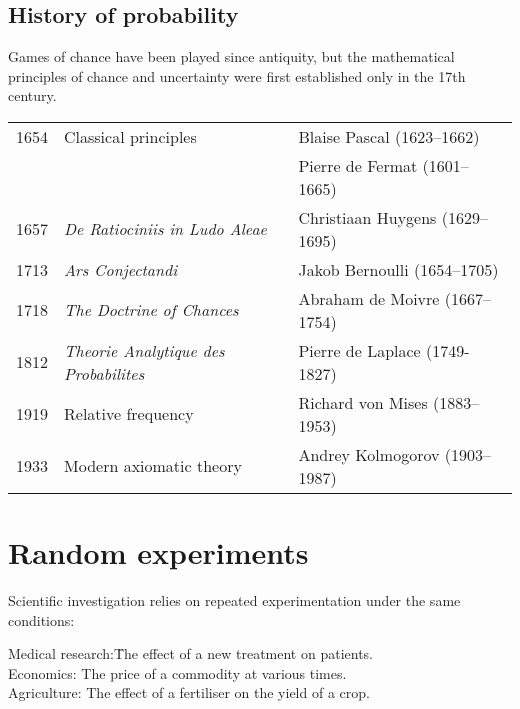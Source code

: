 \documentclass[lecture]{csm}
\begin{document}
\maketitle
\tableofcontents

\subsection*{History of probability}
Games of chance have been played since antiquity, but the mathematical principles of chance and uncertainty were first established only in the 17th century.

\vspace*{4ex}
\begin{tabular}{lll}
1654		& Classical principles 	& Blaise Pascal (1623--1662) \\
		&						& Pierre de Fermat (1601--1665)  \\
1657		& \textit{De Ratiociniis in Ludo Aleae} & Christiaan Huygens (1629--1695) \\
1713		& \textit{Ars Conjectandi} & Jakob Bernoulli (1654--1705) \\ 
1718		& \textit{The Doctrine of Chances} & Abraham de Moivre (1667--1754) \\
1812		& \textit{Theorie Analytique des Probabilites} & Pierre de Laplace (1749-1827) \\
1919		& Relative frequency & Richard von Mises (1883--1953) \\
1933		& Modern axiomatic theory & Andrey Kolmogorov (1903--1987)
\end{tabular}

\section{Random experiments}
Scientific investigation relies on repeated experimentation under the same conditions:

\begin{tabbing}
\quad Medical research:\quad 	\= The effect of a new treatment on patients. \\
\quad Economics:				\> The price of a commodity at various times. \\
\quad Agriculture: 			\> The effect of a fertiliser on the yield of a crop.
\end{tabbing}
\end{document}
